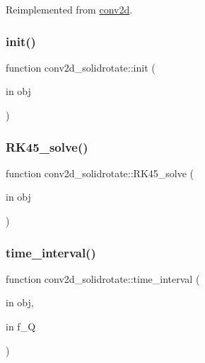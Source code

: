 Reimplemented from \hyperlink{classconv2d_a2a9302ee21fb44a98550dcae0fa1d855}{conv2d}.

\mbox{\label{classconv2d__solidrotate_ac363844625811bcd6f888a1c26537aec}} 
\subsubsection{\texorpdfstring{init()}{init()}}
{\footnotesize\ttfamily function conv2d\+\_\+solidrotate\+::init (\begin{DoxyParamCaption}\item[{in}]{obj }\end{DoxyParamCaption})}

\mbox{\label{classconv2d__solidrotate_a7430b64120c77138896f924b876e0797}} 
\subsubsection{\texorpdfstring{R\+K45\+\_\+solve()}{RK45\_solve()}}
{\footnotesize\ttfamily function conv2d\+\_\+solidrotate\+::\+R\+K45\+\_\+solve (\begin{DoxyParamCaption}\item[{in}]{obj }\end{DoxyParamCaption})}

\mbox{\label{classconv2d__solidrotate_a1eaac9a56f92f63afbe7dceb058373b4}} 
\subsubsection{\texorpdfstring{time\+\_\+interval()}{time\_interval()}}
{\footnotesize\ttfamily function conv2d\+\_\+solidrotate\+::time\+\_\+interval (\begin{DoxyParamCaption}\item[{in}]{obj,  }\item[{in}]{f\+\_\+Q }\end{DoxyParamCaption})}



